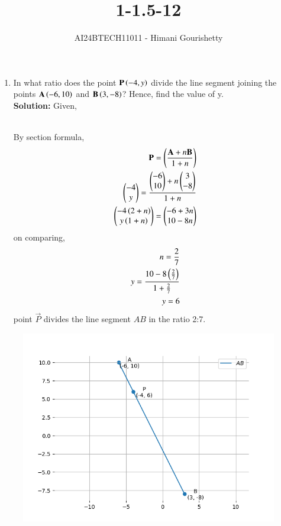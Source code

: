 \documentclass[journal,12pt,onecolumn]{IEEEtran}
\theoremstyle{remark}
\begin{document}

\vspace{3cm}

\title{1-1.5-12}
\author{AI24BTECH11011 - Himani Gourishetty}
\maketitle
\bigskip


\renewcommand{\thefigure}{\theenumi}
\renewcommand{\thetable}{\theenumi}
\begin{enumerate}
    \item In what ratio does the point $\mathbf{P}\left(-4,y\right)$ divide the line segment joining the points $\mathbf{A}\left(-6,10\right)$ and $\mathbf{B}\left(3,-8\right)$? Hence, find the value of y.\\
    \textbf{Solution:}
    Given,\\
\begin{table}[h!]    
\centering

\label{q2}
\end{table}
   \\ By section formula,
 \begin{align}
\mathbf{P}=\left(\frac{\mathbf{A}+n\mathbf{B}}{1+n}\right)\\
\begin{pmatrix}-4 \\ y\end{pmatrix} =\frac{\begin{pmatrix}-6 \\ 10\end{pmatrix}+n\begin{pmatrix}3 \\ -8\end{pmatrix}}{1+n}\\
 \begin{pmatrix}-4\left(2+n\right) \\ y\left(1+n\right)\end{pmatrix}=\begin{pmatrix}-6+3n \\ 10-8n\end{pmatrix}\\
\end{align}
on comparing,
 \begin{align}
n=\frac{2}{7}\\
y=\frac{10-8\left(\frac{2}{7}\right)}{1+\frac{2}{7}}\\
 y=6
  \end{align}
point $\vec{P}$ divides the line segment $AB$ in the ratio 2:7.
    
\end{enumerate}
\begin{figure}[h!]
   \centering
   \includegraphics[width=0.7\linewidth]{figs/plot2.png}
   \label{q2}
\end{figure}
\end{document}
